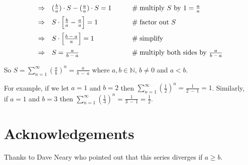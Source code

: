 \documentclass[11pt, oneside]{article}   	%
\begin{document}
\begin{equation*}
\begin{array}{lllll}
\vspace{2.0mm}
&\Rightarrow&  (\frac{b}{a}) \cdot S - (\frac{a}{a}) \cdot S = 1                                                                                                   &\qquad  \mathrel{\#} \text{multiply $S$ by $1 = \frac{a}{a}$}            \\
\vspace{2.0mm}
&\Rightarrow&  S \cdot \Big [\frac{b}{a}  - \frac{a}{a} \Big ] = 1                                                                                                 &\qquad  \mathrel{\#} \text{factor out $S$}                                          \\
\vspace{2.0mm}
&\Rightarrow& S \cdot \Big [ \frac{b \:-\: a} {a} \Big ]= 1                                                                                                           &\qquad  \mathrel{\#} \text{simplify}                                                      \\ 
&\Rightarrow& S  = \frac{a}{b \:-\: a}                                                                                                                                        &\qquad  \mathrel{\#} \text{multiply both sides by $ \frac{a}{b \:-\: a} $}
\end{array}
\end{equation*}

\bigskip
\noindent
So $S = \sum\limits_{n = 1}^\infty (\frac{a}{b})^n  =  \frac{a}{b \:-\: a}$ where $a,b \in \mathbb{N}$, $b \neq 0$ and $a < b$.  

\bigskip
\noindent
For example, if we  let $a =1$ and $b =2$ then $\sum\limits_{n = 1}^\infty (\frac{1}{2})^n  =  \frac{1}{2 \:-\: 1} = 1$. Similarly, if $a =1$ and $b = 3$ then 
$\sum\limits_{n = 1}^\infty (\frac{1}{3})^n  =  \frac{1}{3 \:-\: 1} = \frac{1}{2}$. 

\bigskip
\noindent
\section*{Acknowledgements}

Thanks to Dave Neary who pointed out that this series diverges if $a \geq b$.
\end{document}
